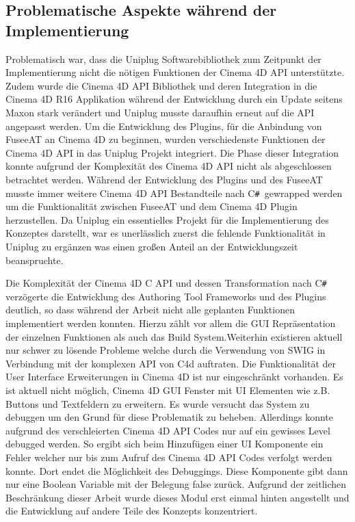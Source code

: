 \documentclass[pagesize, paper=a4, fontsize=12pt, titlepage=true, headings=small, headnosepline, abstractoff, liststotoc, nochapterprefix, plainheadsepline, twoside]{scrreprt}
\newcommand{\CSS}{C\texttt{\# }}
\newcommand{\CPPS}{C\nolinebreak\hspace{-.05em}\raisebox{.4ex}{\tiny\bf +}\nolinebreak\hspace{-.10em}\raisebox{.4ex}{\tiny\bf +} }
\begin{document}
\subsection{Problematische Aspekte während der Implementierung}
Problematisch war, dass die Uniplug Softwarebibliothek zum Zeitpunkt der Implementierung nicht die nötigen Funktionen der Cinema 4D API unterstützte. Zudem wurde die Cinema 4D API Bibliothek und deren Integration in die Cinema 4D R16 Applikation während der Entwicklung durch ein Update seitens Maxon stark verändert und Uniplug musste daraufhin erneut auf die API angepasst werden. Um die Entwicklung des Plugins, für die Anbindung von FuseeAT an Cinema 4D zu beginnen, wurden verschiedenste  Funktionen der Cinema 4D API in das Uniplug Projekt integriert. Die Phase dieser Integration konnte aufgrund der Komplexität des Cinema 4D API nicht als abgeschlossen betrachtet werden. Während der Entwicklung des Plugins und des FuseeAT musste immer weitere Cinema 4D API Bestandteile nach \CSS gewrapped werden um die Funktionalität zwischen FuseeAT und dem Cinema 4D Plugin herzustellen. Da Uniplug ein essentielles Projekt für die Implementierung des Konzeptes darstellt, war es unerlässlich zuerst die fehlende Funktionalität in Uniplug zu ergänzen was einen großen Anteil an der Entwicklungszeit beanspruchte.

Die Komplexität der Cinema 4D \CPPS API und dessen Transformation nach \CSS verzögerte die Entwicklung des Authoring Tool Frameworks und des Plugins deutlich, so dass während der Arbeit nicht alle geplanten Funktionen implementiert werden konnten. Hierzu zählt vor allem die GUI Repräsentation der einzelnen Funktionen als auch das Build System.Weiterhin existieren aktuell nur schwer zu lösende Probleme welche durch die Verwendung von SWIG  in Verbindung mit der komplexen API von C4d auftraten. Die Funktionalität der User Interface Erweiterungen in Cinema 4D ist nur eingeschränkt vorhanden. Es ist aktuell nicht möglich, Cinema 4D GUI Fenster mit UI Elementen wie z.B. Buttons und Textfeldern zu erweitern. Es wurde versucht das System zu debuggen um den Grund für diese Problematik zu beheben. Allerdings konnte aufgrund des verschleierten Cinema 4D API Codes nur auf ein gewisses Level debugged werden. So ergibt sich beim Hinzufügen einer UI Komponente ein Fehler welcher nur bis zum Aufruf des Cinema 4D API Codes verfolgt werden konnte. Dort endet die Möglichkeit des Debuggings. Diese Komponente gibt dann nur eine Boolean Variable mit der Belegung false zurück. Aufgrund der zeitlichen Beschränkung dieser Arbeit wurde dieses Modul erst einmal hinten angestellt und die Entwicklung auf andere Teile des Konzepts konzentriert.
\end{document}

